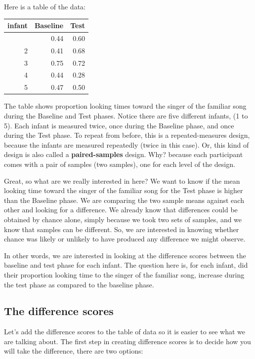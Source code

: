 \documentclass[
  letterpaper,
  DIV=11,
  numbers=noendperiod]{scrreprt}
\begin{document}
Here is a table of the data:

\begin{longtable}[]{@{}rrr@{}}
\toprule\noalign{}
infant & Baseline & Test \\
\midrule\noalign{}
\endhead
\bottomrule\noalign{}
\endlastfoot
1 & 0.44 & 0.60 \\
2 & 0.41 & 0.68 \\
3 & 0.75 & 0.72 \\
4 & 0.44 & 0.28 \\
5 & 0.47 & 0.50 \\
\end{longtable}

The table shows proportion looking times toward the singer of the
familiar song during the Baseline and Test phases. Notice there are five
different infants, (1 to 5). Each infant is measured twice, once during
the Baseline phase, and once during the Test phase. To repeat from
before, this is a repeated-measures design, because the infants are
measured repeatedly (twice in this case). Or, this kind of design is
also called a \textbf{paired-samples} design. Why? because each
participant comes with a pair of samples (two samples), one for each
level of the design.

Great, so what are we really interested in here? We want to know if the
mean looking time toward the singer of the familiar song for the Test
phase is higher than the Baseline phase. We are comparing the two sample
means against each other and looking for a difference. We already know
that differences could be obtained by chance alone, simply because we
took two sets of samples, and we know that samples can be different. So,
we are interested in knowing whether chance was likely or unlikely to
have produced any difference we might observe.

In other words, we are interested in looking at the difference scores
between the baseline and test phase for each infant. The question here
is, for each infant, did their proportion looking time to the singer of
the familiar song, increase during the test phase as compared to the
baseline phase.

\subsection{The difference scores}\label{the-difference-scores}

Let's add the difference scores to the table of data so it is easier to
see what we are talking about. The first step in creating difference
scores is to decide how you will take the difference, there are two
options:
\end{document}
